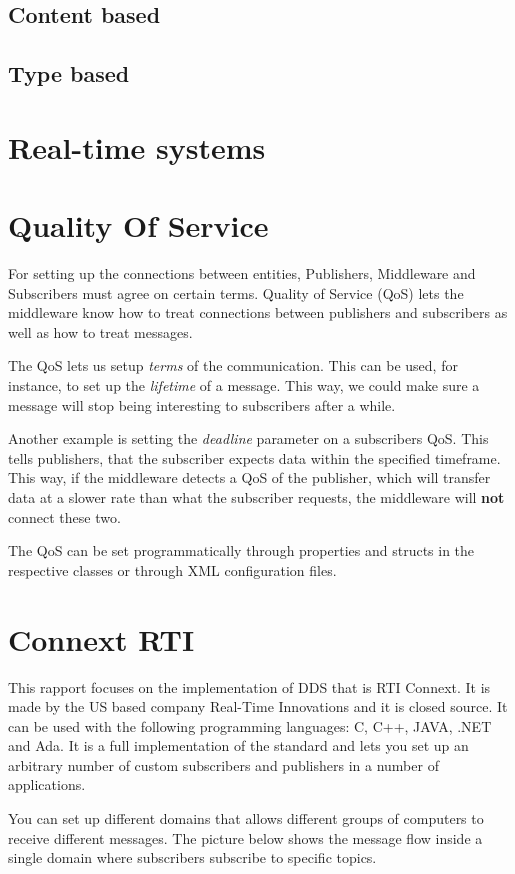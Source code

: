 \subsection{Content based}
\subsection{Type based}


\section{Real-time systems}


\section{Quality Of Service}
For setting up the connections between entities, Publishers, Middleware and Subscribers must agree on certain terms. Quality of Service (QoS) lets the middleware know how to treat connections between publishers and subscribers as well as how to treat messages.

The QoS lets us setup \textit{terms} of the communication. This can be used, for instance, to set up the \textit{lifetime} of a message. This way, we could make sure a message will stop being interesting to subscribers after a while. 

Another example is setting the \textit{deadline} parameter on a subscribers QoS. This tells publishers, that the subscriber expects data within the specified timeframe. This way, if the middleware detects a QoS of the publisher, which will transfer data at a slower rate than what the subscriber requests, the middleware will \textbf{not} connect these two.

The QoS can be set programmatically through properties and structs in the respective classes or through XML configuration files. 


\section{Connext RTI}
This rapport focuses on the implementation of DDS that is RTI Connext. It is made by the US based company Real-Time Innovations and it is closed source. It can be used with the following programming languages: C, C++, JAVA, .NET and Ada. 
It is a full implementation of the standard and lets you set up an arbitrary number of custom subscribers and publishers in a number of applications.

You can set up different domains that allows different groups of computers to receive different messages. The picture below shows the message flow inside a single domain where subscribers subscribe to specific topics.

